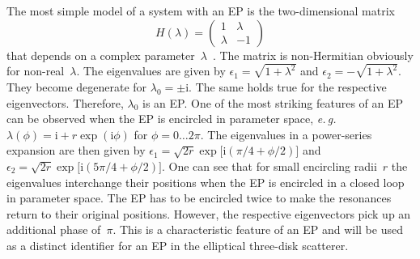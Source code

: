 \documentclass[doublecol]{epl2}
\newcommand{\ii}{\mathrm{i}}
\begin{document}
The most simple model of a system with an EP is the two-dimensional matrix
\begin{equation}
  H(\lambda) = \begin{pmatrix}
    1 & \lambda\\
    \lambda & -1
  \end{pmatrix}
\end{equation}
that depends on a complex parameter~$\lambda$~\cite{kato_perturbation_2013}. The matrix is non-Hermitian obviously for non-real~$\lambda$. The eigenvalues are given by $\epsilon_1 = \sqrt{1+\lambda^2}$ and $\epsilon_2 = -\sqrt{1+\lambda^2}$. They become degenerate for $\lambda_0 = {\pm \ii}$. The same holds true for the respective eigenvectors. Therefore, $\lambda_0$ is an EP. One of the most striking features of an EP can be observed when the EP is encircled in parameter space, \emph{e.\,g.} $\lambda(\phi) = \ii + r \exp(\ii\phi)$ for $\phi = 0 \dots 2\pi$. The eigenvalues in a power-series expansion are then given by $\epsilon_1 = \sqrt{2r} \exp\bigl[\ii (\pi/4 + \phi/2)\bigr]$ and $\epsilon_2 = \sqrt{2r} \exp\bigl[\ii (5\pi/4 + \phi/2)\bigr]$. One can see that for small encircling radii~$r$ the eigenvalues interchange their positions when the EP is encircled in a closed loop in parameter space. The EP has to be encircled twice to make the resonances return to their original positions. However, the respective eigenvectors pick up an additional phase of~$\pi$. This is a characteristic feature of an EP and will be used as a distinct identifier for an EP in the elliptical three-disk scatterer.
\end{document}

